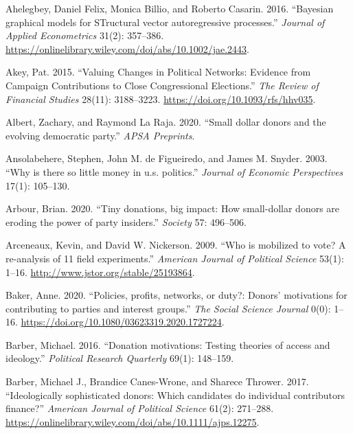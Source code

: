 \documentclass[12pt,]{article}
\begin{document}
\hypertarget{refs}{}
\begin{CSLReferences}{1}{0}
\leavevmode{}%
Ahelegbey, Daniel Felix, Monica Billio, and Roberto Casarin. 2016.
{``Bayesian graphical models for STructural vector autoregressive
processes.''} \emph{Journal of Applied Econometrics} 31(2): 357--386.
\url{https://onlinelibrary.wiley.com/doi/abs/10.1002/jae.2443}.

\leavevmode{}%
Akey, Pat. 2015. {``{Valuing Changes in Political Networks: Evidence
from Campaign Contributions to Close Congressional Elections}.''}
\emph{The Review of Financial Studies} 28(11): 3188--3223.
\url{https://doi.org/10.1093/rfs/hhv035}.

\leavevmode{}%
Albert, Zachary, and Raymond La Raja. 2020. {``Small dollar donors and
the evolving democratic party.''} \emph{APSA Preprints}.

\leavevmode{}%
Ansolabehere, Stephen, John M. de Figueiredo, and James M. Snyder. 2003.
{``Why is there so little money in u.s. politics.''} \emph{Journal of
Economic Perspectives} 17(1): 105--130.

\leavevmode{}%
Arbour, Brian. 2020. {``Tiny donations, big impact: How small-dollar
donors are eroding the power of party insiders.''} \emph{Society} 57:
496--506.

\leavevmode{}%
Arceneaux, Kevin, and David W. Nickerson. 2009. {``Who is mobilized to
vote? A re-analysis of 11 field experiments.''} \emph{American Journal
of Political Science} 53(1): 1--16.
\url{http://www.jstor.org/stable/25193864}.

\leavevmode{}%
Baker, Anne. 2020. {``Policies, profits, networks, or duty?: Donors'
motivations for contributing to parties and interest groups.''}
\emph{The Social Science Journal} 0(0): 1--16.
\url{https://doi.org/10.1080/03623319.2020.1727224}.

\leavevmode{}%
Barber, Michael. 2016. {``Donation motivations: Testing theories of
access and ideology.''} \emph{Political Research Quarterly} 69(1):
148--159.

\leavevmode{}%
Barber, Michael J., Brandice Canes-Wrone, and Sharece Thrower. 2017.
{``Ideologically sophisticated donors: Which candidates do individual
contributors finance?''} \emph{American Journal of Political Science}
61(2): 271--288.
\url{https://onlinelibrary.wiley.com/doi/abs/10.1111/ajps.12275}.


\end{CSLReferences}
\end{document}

